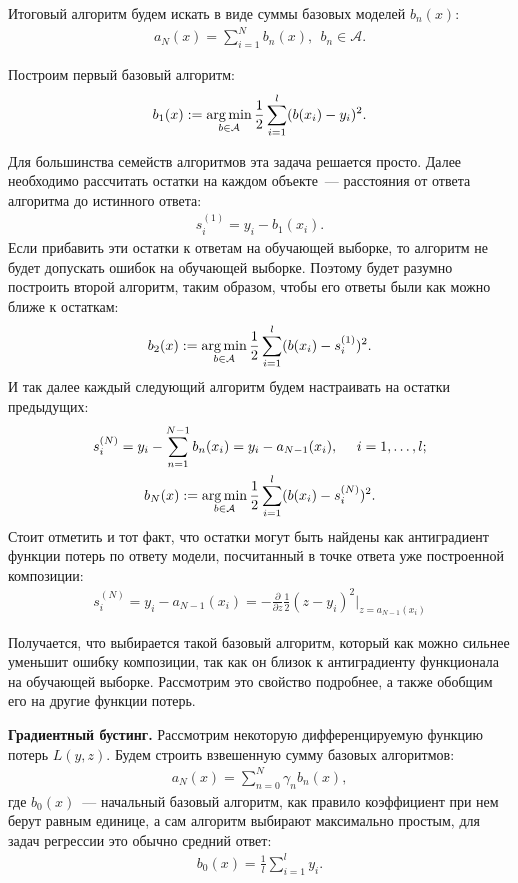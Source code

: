 \documentclass[12pt,a4paper]{article} %
\begin{document}
Итоговый алгоритм будем искать в виде суммы базовых моделей $b_n(x)$:
\begin{gather}\label{bust2}
	a_N(x) = \sum\limits_{i=1}^{N}b_n(x),~~b_n\in \mathcal{A}.
\end{gather}

Построим первый базовый алгоритм:
\begin{gather}\label{bust3}
	b_1(x): = \mathop{\rm arg\,min}\limits_{b\in\mathcal{A}}\frac{1}{2}\sum\limits_{i=1}^{l}(b(x_i)-y_i)^2.
\end{gather}

Для большинства семейств алгоритмов эта задача решается просто. Далее необходимо рассчитать остатки на каждом объекте~--- расстояния от ответа алгоритма до истинного ответа:
\begin{gather}\label{bust4}
	s_i^{(1)} = y_i - b_1(x_i).
\end{gather}
Если прибавить эти остатки к ответам на обучающей выборке, то алгоритм не будет допускать ошибок на обучающей выборке. Поэтому будет разумно построить второй алгоритм, таким образом, чтобы его ответы были как можно ближе к остаткам:
\begin{gather}\label{bust5}
	b_2(x): = \mathop{\rm arg\,min}\limits_{b\in\mathcal{A}}\frac{1}{2}\sum\limits_{i=1}^{l}(b(x_i)-s_i^{(1)})^2.
\end{gather}
И так далее каждый следующий алгоритм будем настраивать на остатки предыдущих:
\begin{gather}\label{bust6}
	s_i^{(N)} = y_i - \sum\limits_{n=1}^{N-1}b_n(x_i) = y_i - a_{N-1}(x_i),~~~~i=1,\dots,l;
	\\
	b_N(x): = \mathop{\rm arg\,min}\limits_{b\in\mathcal{A}}\frac{1}{2}\sum\limits_{i=1}^{l}(b(x_i)-s_i^{(N)})^2.
\end{gather}
Стоит отметить и тот факт, что остатки могут быть найдены как антиградиент функции потерь по ответу модели, посчитанный в точке ответа уже построенной композиции:
\begin{gather}\label{bust7}
	s_i^{(N)} = y_i - a_{N-1}(x_i) = - \frac{\partial }{\partial z}\frac{1}{2}(z-y_i)^2\bigg|_{z=a_{N-1}(x_i)}
\end{gather}

Получается, что выбирается такой базовый алгоритм, который как можно сильнее уменьшит ошибку композиции, так как он близок к антиградиенту функционала на обучающей выборке. Рассмотрим это свойство подробнее, а также обобщим его на другие функции потерь.

\textbf{Градиентный бустинг.} Рассмотрим некоторую дифференцируемую функцию потерь $L(y,z)$. Будем строить взвешенную сумму базовых алгоритмов:
\begin{gather}\label{gradbust1}
	a_N(x) = \sum\limits_{n=0}^{N}\gamma_nb_n(x), 
\end{gather}
где $b_0(x)$~--- начальный базовый алгоритм, как правило коэффициент при нем берут равным единице, а сам алгоритм выбирают максимально простым, для задач регрессии это обычно средний ответ:
\begin{gather}\label{gradbust2}
	b_0(x) =  \frac{1}{l}\sum\limits_{i=1}^{l}y_i.
\end{gather}
\end{document}
